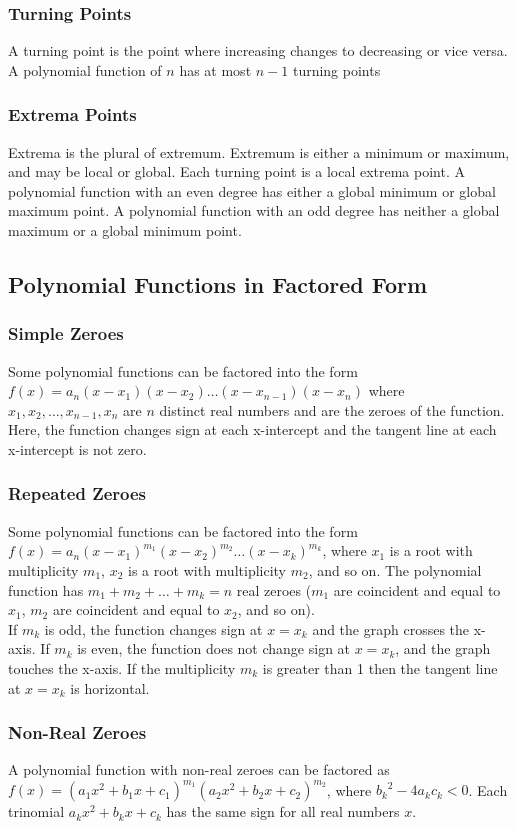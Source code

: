 \documentclass{article}
\begin{document}
	\subsubsection{Turning Points}
	A turning point is the point where increasing changes to decreasing or vice versa. A polynomial function of $n$ has at most $n-1$ turning points
	\subsubsection{Extrema Points}
	Extrema is the plural of extremum. Extremum is either a minimum or maximum, and may be local or global. Each turning point is a local extrema point. A polynomial function with an even degree has either a global minimum or global maximum point. A polynomial function with an odd degree has neither a global maximum or a global minimum point.
	\subsection{Polynomial Functions in Factored Form}
	\subsubsection{Simple Zeroes}
	Some polynomial functions can be factored into the form $f(x)=a_n(x-x_1)(x-x_2)\dots(x-x_{n-1})(x-x_n)$ where $x_1, x_2, \dots, x_{n-1}, x_n$ are $n$ distinct real numbers and are the zeroes of the function. Here, the function changes sign at each x-intercept and the tangent line at each x-intercept is not zero.
	\subsubsection{Repeated Zeroes}
	Some polynomial functions can be factored into the form $f(x)=a_n(x-x_1)^{m_1}(x-x_2)^{m_2}\dots(x-x_k)^{m_k}$, where $x_1$ is a root with multiplicity $m_1$, $x_2$ is a root with multiplicity $m_2$, and so on. The polynomial function has $m_1+m_2+\dots+m_k=n$ real zeroes ($m_1$ are coincident and equal to $x_1$, $m_2$ are coincident and equal to $x_2$, and so on).\\
	If $m_k$ is odd, the function changes sign at $x=x_k$ and the graph crosses the x-axis. If $m_k$ is even, the function does not change sign at $x=x_k$, and the graph touches the x-axis. If the multiplicity $m_k$ is greater than 1 then the tangent line at $x=x_k$ is horizontal.
	\subsubsection{Non-Real Zeroes}
	A polynomial function with non-real zeroes can be factored as $f(x)=(a_1x^2+b_1x+c_1)^{m_1}(a_2x^2+b_2x+c_2)^{m_2}$, where ${b_k}^2-4a_kc_k<0$. Each trinomial $a_kx^2+b_kx+c_k$ has the same sign for all real numbers $x$.
\end{document}
